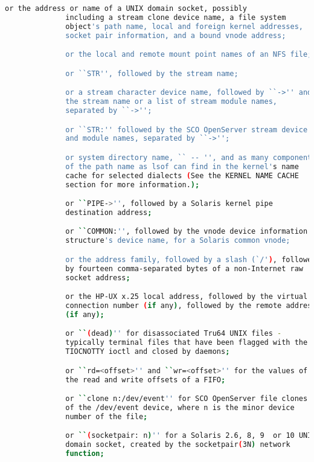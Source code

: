 {{\begin{lstlisting}[language=bash]
              or the address or name of a UNIX domain socket, possibly
              including a stream clone device name, a file system
              object's path name, local and foreign kernel addresses,
              socket pair information, and a bound vnode address;

              or the local and remote mount point names of an NFS file;

              or ``STR'', followed by the stream name;

              or a stream character device name, followed by ``->'' and
              the stream name or a list of stream module names,
              separated by ``->'';

              or ``STR:'' followed by the SCO OpenServer stream device
              and module names, separated by ``->'';

              or system directory name, `` -- '', and as many components
              of the path name as lsof can find in the kernel's name
              cache for selected dialects (See the KERNEL NAME CACHE
              section for more information.);

              or ``PIPE->'', followed by a Solaris kernel pipe
              destination address;

              or ``COMMON:'', followed by the vnode device information
              structure's device name, for a Solaris common vnode;

              or the address family, followed by a slash (`/'), followed
              by fourteen comma-separated bytes of a non-Internet raw
              socket address;

              or the HP-UX x.25 local address, followed by the virtual
              connection number (if any), followed by the remote address
              (if any);

              or ``(dead)'' for disassociated Tru64 UNIX files -
              typically terminal files that have been flagged with the
              TIOCNOTTY ioctl and closed by daemons;

              or ``rd=<offset>'' and ``wr=<offset>'' for the values of
              the read and write offsets of a FIFO;

              or ``clone n:/dev/event'' for SCO OpenServer file clones
              of the /dev/event device, where n is the minor device
              number of the file;

              or ``(socketpair: n)'' for a Solaris 2.6, 8, 9  or 10 UNIX
              domain socket, created by the socketpair(3N) network
              function;


\end{lstlisting}}}

